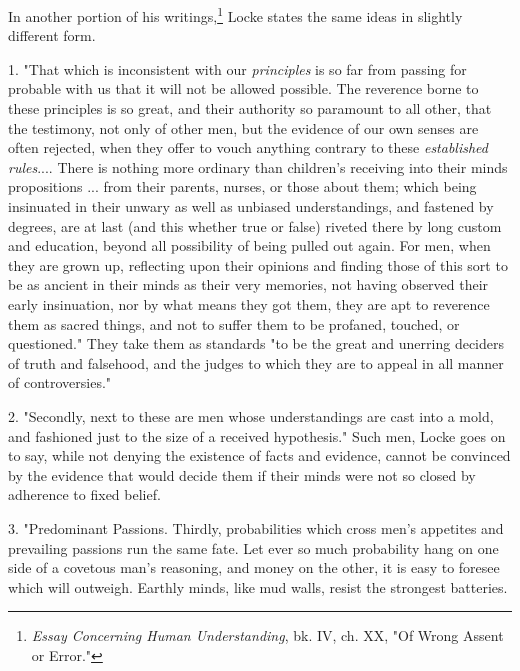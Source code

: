 \documentclass[showtrims,ustradepaper]{memoir}
\begin{document}
In another portion of his
writings,\footnote{\emph{Essay Concerning Human Understanding}, bk. IV, ch. XX, "Of Wrong Assent or Error."}
Locke states the same ideas in slightly different form.


1. "That which is inconsistent with our \emph{principles} is so far from
passing for probable with us that it will not be allowed possible. The
reverence borne to these principles is so great, and their authority so
paramount to all other, that the testimony, not only of other men, but
the evidence of our own senses are often rejected, when they offer to
vouch anything contrary to these \emph{established rules}.... There is
nothing more ordinary than children's receiving into their minds
propositions ... from their parents, nurses, or those about them; which
being insinuated in their unwary as well as unbiased understandings, and
fastened by degrees, are at last (and this whether true or false)
riveted there by long custom and education, beyond all possibility of
being pulled out again. For men, when they are grown up, reflecting upon
their opinions and finding those of this sort to be as ancient in their
minds as their very memories, not having observed their early
insinuation, nor by what means they got them, they are apt to reverence
them as sacred things, and not to suffer them to be profaned, touched,
or questioned." They take them as standards "to be the great and
unerring deciders of truth and falsehood, and the judges to which they
are to appeal in all manner of controversies."


2. "Secondly, next to these are men whose understandings are cast into a
mold, and fashioned just to the size of a received hypothesis." Such
men, Locke goes on to say, while not denying the existence of facts and
evidence, cannot be convinced by the evidence
that
would decide them if their minds were not so closed by adherence to
fixed belief.


3. "Predominant Passions. Thirdly, probabilities which cross men's
appetites and prevailing passions run the same fate. Let ever so much
probability hang on one side of a covetous man's reasoning, and money on
the other, it is easy to foresee which will outweigh. Earthly minds,
like mud walls, resist the strongest batteries.

\end{document}
